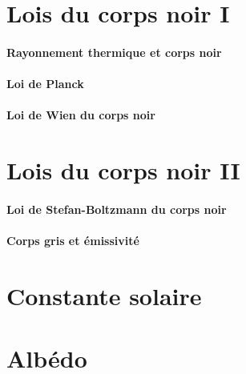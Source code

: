 \documentclass[a4paper,DIV16,10pt]{scrartcl}
\begin{document}
\begin{detail} 
\newpage
\section{Lois du corps noir I}
	\paragraph{Rayonnement thermique et corps noir}
		
		

	\paragraph{Loi de Planck}
		

	\paragraph{Loi de Wien du corps noir}
		

%

\newpage
\section{Lois du corps noir II}
	\paragraph{Loi de Stefan-Boltzmann du corps noir}
		
	\paragraph{Corps gris et émissivité}
		

\newpage
\section{Constante solaire}



\newpage 
\section{Albédo} 



\end{detail}
\end{document}
